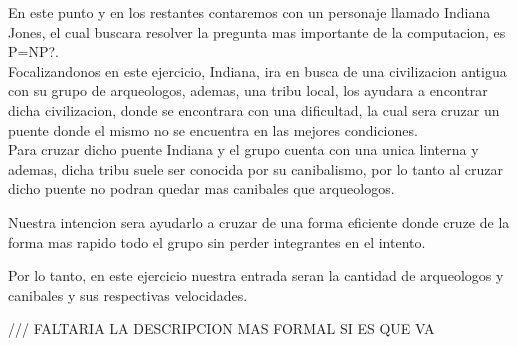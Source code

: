 En este punto y en los restantes contaremos con un personaje llamado Indiana Jones, el cual buscara resolver la pregunta mas importante de la computacion, es P=NP?.\\

Focalizandonos en este ejercicio, Indiana, ira en busca de una civilizacion antigua con su grupo de arqueologos, ademas, una tribu local, los ayudara a encontrar dicha civilizacion, donde se encontrara con una dificultad, la cual sera cruzar un puente donde el mismo no se encuentra en las mejores condiciones.\\

Para cruzar dicho puente Indiana y el grupo cuenta con una unica linterna y ademas, dicha tribu suele ser conocida por su canibalismo, por lo tanto al cruzar dicho puente no podran quedar mas canibales que arqueologos.

Nuestra intencion sera ayudarlo a cruzar de una forma eficiente donde cruze de la forma mas rapido todo el grupo sin perder integrantes en el intento.

Por lo tanto, en este ejercicio nuestra entrada seran la cantidad de arqueologos y canibales y sus respectivas velocidades.


/// FALTARIA LA DESCRIPCION MAS FORMAL SI ES QUE VA